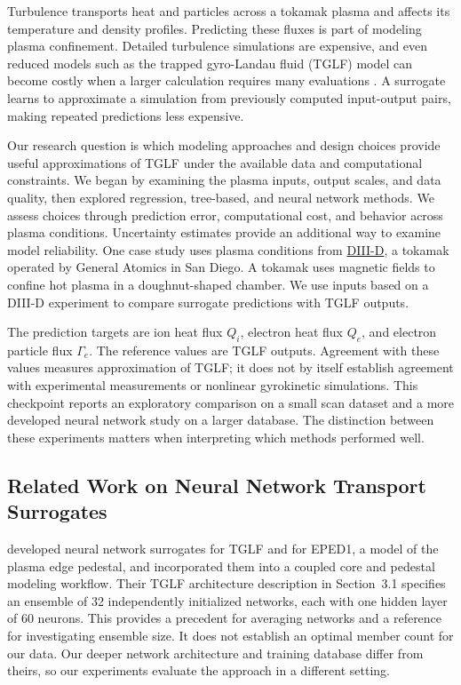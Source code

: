 \documentclass[12pt,letterpaper]{article}
\begin{document}
Turbulence transports heat and particles across a tokamak plasma and affects
its temperature and density profiles. Predicting these fluxes is part of
modeling plasma confinement. Detailed turbulence simulations are expensive,
and even reduced models such as the trapped gyro-Landau fluid (TGLF) model
can become costly when a larger
calculation requires many evaluations \citep{meneghini2017, cao2026}.
A surrogate learns to approximate a simulation from previously computed
input-output pairs, making repeated predictions less expensive.

Our research question is which modeling approaches and design choices provide
useful approximations of TGLF under the available data and computational
constraints. We began by examining the plasma inputs, output scales, and data
quality, then explored regression, tree-based, and neural network methods.
We assess choices through prediction error, computational cost, and behavior
across plasma conditions. Uncertainty estimates provide an additional way to
examine model reliability. One case study uses plasma conditions from
\href{https://www.ga.com/magnetic-fusion/diii-d}{DIII-D}, a tokamak operated
by General Atomics in San Diego. A tokamak uses magnetic fields to confine
hot plasma in a doughnut-shaped chamber. We use inputs based on a DIII-D
experiment to compare surrogate predictions with TGLF outputs.

The prediction targets are ion heat flux $Q_i$, electron heat flux $Q_e$, and
electron particle flux $\Gamma_e$. The reference values are TGLF outputs.
Agreement with these values measures approximation of TGLF; it does not by
itself establish agreement with experimental measurements or nonlinear
gyrokinetic simulations. This checkpoint reports an exploratory comparison on
a small scan dataset and a more developed neural network study on a larger
database. The distinction between these experiments matters when interpreting
which methods performed well.

\subsection{Related Work on Neural Network Transport Surrogates}

\citet{meneghini2017} developed neural network surrogates for TGLF and for
EPED1, a model of the plasma edge pedestal, and incorporated them into a coupled core and pedestal modeling workflow.
Their TGLF architecture description in Section~3.1 specifies an ensemble of
32 independently initialized networks, each with one hidden layer of 60
neurons. This provides a precedent for averaging networks and a reference
for investigating ensemble size. It does not establish an optimal member
count for our data. Our deeper network architecture and training database
differ from theirs, so our experiments evaluate the approach in a different
setting.
\end{document}
